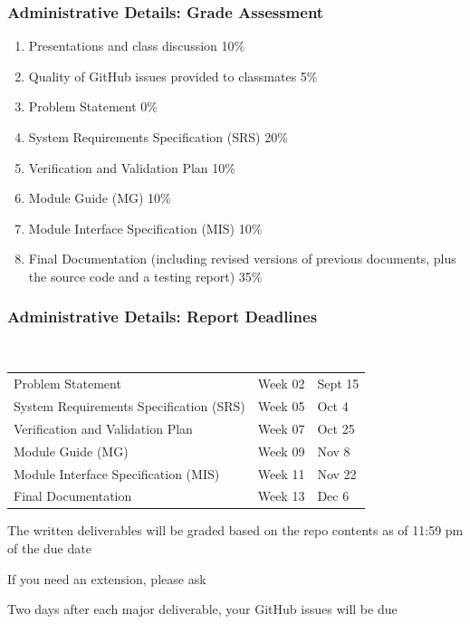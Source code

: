 \documentclass[t,12pt,numbers,fleqn]{beamer}
\begin{document}

\begin{frame}
\frametitle{Administrative Details: Grade Assessment}

\begin {enumerate}

\item Presentations and class discussion 10\%

\item Quality of GitHub issues provided to classmates 5\%

\item Problem Statement 0\%

\item System Requirements Specification (SRS) 20\%

\item Verification and Validation Plan 10\%

\item Module Guide (MG) 10\%

\item Module Interface Specification (MIS) 10\%

\item Final Documentation (including revised versions of previous documents,
  plus the source code and a testing report) 35\%

\end {enumerate}

\end{frame}


\begin{frame}
\frametitle{Administrative Details: Report Deadlines}
~\newline
\begin{tabular}{l l l}
Problem Statement & Week 02 & Sept 15\\
System Requirements Specification (SRS) & Week 05 & Oct 4\\
Verification and Validation Plan & Week 07 & Oct 25\\
Module Guide (MG) & Week 09 & Nov 8\\
Module Interface Specification (MIS) & Week 11 & Nov 22\\
Final Documentation & Week 13 & Dec 6\\
\end {tabular}

\bi
\item The written deliverables will be graded based on the repo contents as of
11:59 pm of the due date
\item If you need an extension, please ask
\item Two days after each major deliverable, your GitHub issues will be due
\ei

\end{frame}
\end{document}
